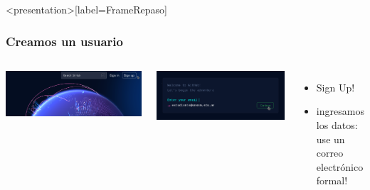 \begin{frame}<presentation>[label=FrameRepaso]
  \frametitle{Creamos un usuario}

  \begin{columns}

      \includegraphics[width=\textwidth]{Screenshots/SignUp.png}

      \includegraphics[width=\textwidth]{Screenshots/CrearUsuario.png}


      \begin{itemize}
	  \item Sign Up! 
	  \item ingresamos los datos: use un correo electrónico formal!
      \end{itemize}

  \end{columns}

\end{frame}

